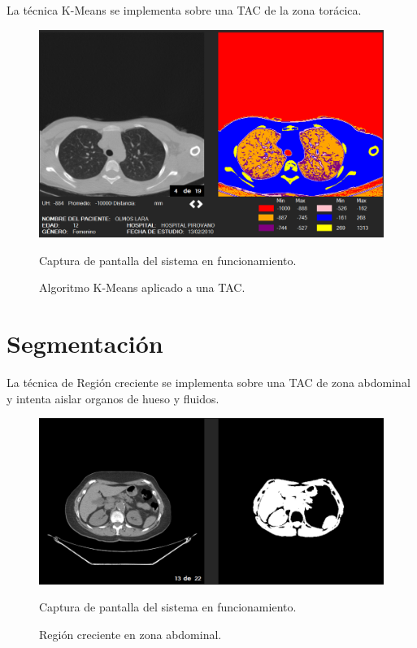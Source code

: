 \documentclass[12pt]{report}
\begin{document}
\newpage
\vspace*{3cm}
La técnica K-Means se implementa sobre una TAC de la zona torácica.
\begin{figure}[H]
\centering
\includegraphics[width = 15 cm, height = 10 cm]{clusterKmeans}
\caption{Algoritmo K-Means aplicado a una TAC.}
Captura de pantalla del sistema en funcionamiento.
\end{figure}

\section{Segmentación}
La técnica de Región creciente se implementa sobre una TAC de zona abdominal y intenta aislar organos de hueso y fluidos.
\vspace*{3cm}
\begin{figure}[H]
\centering
\includegraphics[width = 15 cm, height = 10 cm]{segmentacionRegionCreciente}
\caption{Región creciente en zona abdominal.}
Captura de pantalla del sistema en funcionamiento.
\end{figure}
\end{document}
